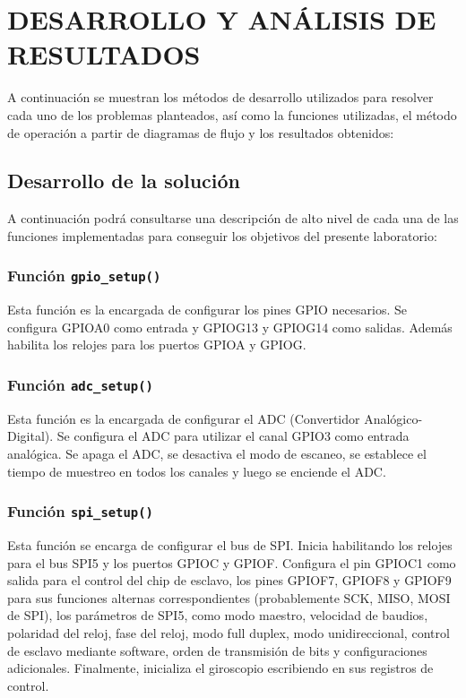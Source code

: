 \newpage
\section{DESARROLLO Y ANÁLISIS DE RESULTADOS}

A continuación se muestran los métodos de desarrollo utilizados para resolver cada uno de los problemas planteados, así como la funciones utilizadas, el método de operación a partir de diagramas de flujo y los resultados obtenidos:

\subsection{Desarrollo de la solución}

A continuación podrá consultarse una descripción de alto nivel de cada una de las funciones implementadas para conseguir los objetivos del presente laboratorio: 

\subsubsection{Función \texttt{gpio\_setup()}}
Esta función es la encargada de configurar los pines GPIO necesarios. Se configura GPIOA0 como entrada y GPIOG13 y GPIOG14 como salidas. Además habilita los relojes para los puertos GPIOA y GPIOG.
\subsubsection{Función \texttt{adc\_setup()}}
Esta función es la encargada de configurar el ADC (Convertidor Analógico-Digital). Se configura el ADC para utilizar el canal GPIO3 como entrada analógica. Se apaga el ADC, se desactiva el modo de escaneo, se establece el tiempo de muestreo en todos los canales y luego se enciende el ADC.
\subsubsection{Función \texttt{spi\_setup()}}
Esta función se encarga de configurar el bus de SPI. Inicia habilitando los relojes para el bus SPI5 y los puertos GPIOC y GPIOF. Configura el pin GPIOC1 como salida para el control del chip de esclavo,
los pines GPIOF7, GPIOF8 y GPIOF9 para sus funciones alternas correspondientes (probablemente SCK, MISO, MOSI de SPI), los parámetros de SPI5, como modo maestro, velocidad de baudios, polaridad del reloj, fase del reloj, modo full duplex, modo unidireccional, control de esclavo mediante software, orden de transmisión de bits y configuraciones adicionales. Finalmente, inicializa el giroscopio escribiendo en sus registros de control.


